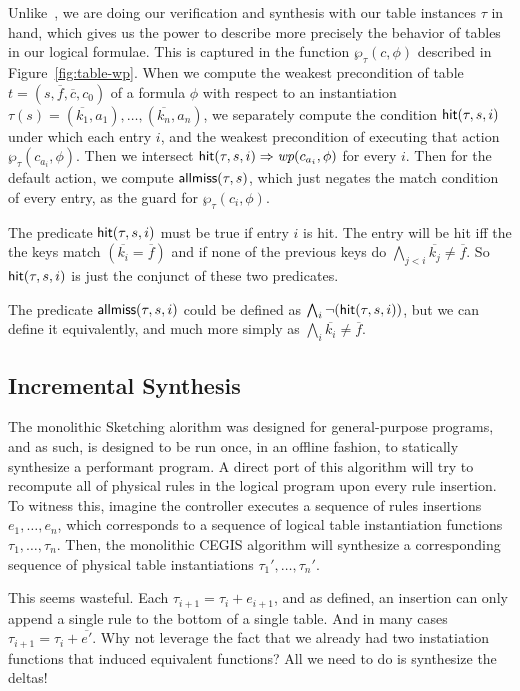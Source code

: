 Unlike~\cite{p4v}, we are doing our verification and synthesis with
our table instances $\tau$ in hand, which gives us the power to
describe more precisely the behavior of tables in our logical
formulae. This is captured in the function $\wp_\tau(c, \phi)$
described in Figure~\ref{fig:table-wp}. When we compute the weakest
precondition of table $t = (s, \overline f, \overline c, c_0)$ of a
formula $\phi$ with respect to an instantiation
$\tau(s) = (\overline{k_1}, a_1), \ldots, (\overline{k_n}, a_n)$, we
separately compute the condition $\mathop{\textsf{hit}}(\tau, s, i)$ under which each
entry $i$, and the weakest precondition of executing that action
$\wp_\tau(c_{a_i}, \phi)$. Then we intersect
$\mathop{\textsf{hit}}(\tau, s, i) \Rightarrow \mathop{\textit{wp}}(c_{a_i}, \phi)$ for every $i$. Then
for the default action, we compute $\mathop{\textsf{allmiss}}(\tau, s)$, which just
negates the match condition of every entry, as the guard for
$\wp_\tau(c_i, \phi)$.

The predicate $\mathop{\textsf{hit}}(\tau, s, i)$ must be true if entry $i$ is hit.
The entry will be hit iff the the keys match
$(\overline{k_i} = \overline f)$ and if none of the previous keys do
$\bigwedge_{j<i}\overline {k_j} \neq \overline f$. So
$\mathop{\textsf{hit}}(\tau, s, i)$ is just the conjunct of these two predicates.

The predicate $\mathop{\textsf{allmiss}}(\tau, s , i)$ could be defined as
$\bigwedge_i \neg(\mathop{\textsf{hit}}(\tau, s, i))$, but we can define it
equivalently, and much more simply as
$\bigwedge_i \overline {k_i} \neq \overline f$.


\subsection{Incremental Synthesis}

The monolithic Sketching alorithm was designed for general-purpose
programs, and as such, is designed to be run once, in an offline
fashion, to statically synthesize a performant program. A direct port
of this algorithm will try to recompute all of physical rules in the
logical program upon every rule insertion. To witness this, imagine
the controller executes a sequence of rules insertions
$e_1,\ldots, e_n$, which corresponds to a sequence of logical table
instantiation functions $\tau_1, \ldots, \tau_n$. Then, the monolithic
CEGIS algorithm will synthesize a corresponding sequence of physical
table instantiations $\tau_1', \ldots, \tau_n'$.

This seems wasteful. Each $\tau_{i+1} = \tau_i + e_{i+1}$, and as
defined, an insertion can only append a single rule to the bottom of a
single table. And in many cases $\tau_{i+1} = \tau_i +
\overline{e'}$. Why not leverage the fact that we already had two
instatiation functions that induced equivalent functions? All we need
to do is synthesize the deltas!

